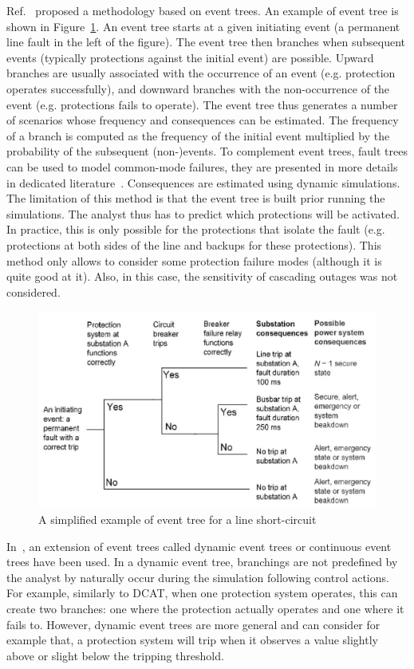 Ref.~\cite{Haarla, GridPSA} proposed a methodology based on event trees. An example of event tree is shown in Figure~\ref{fig:eventTree}. An event tree starts at a given initiating event (a permanent line fault in the left of the figure). The event tree then branches when subsequent events (typically protections against the initial event) are possible. Upward branches are usually associated with the occurrence of an event (e.g. protection operates successfully), and downward branches with the non-occurrence of the event (e.g. protections fails to operate). The event tree thus generates a number of scenarios whose frequency and consequences can be estimated. The frequency of a branch is computed as the frequency of the initial event multiplied by the probability of the subsequent (non-)events. To complement event trees, fault trees can be used to model common-mode failures, they are presented in more details in dedicated literature~\cite{FaultTreeHandbook}. Consequences are estimated using dynamic simulations. The limitation of this method is that the event tree is built prior running the simulations. The analyst thus has to predict which protections will be activated. In practice, this is only possible for the protections that isolate the fault (e.g. protections at both sides of the line and backups for these protections). This method only allows to consider some protection failure modes (although it is quite good at it). Also, in this case, the sensitivity of cascading outages was not considered.

\begin{figure}
    \centering
    \includegraphics[width=0.8\linewidth]{Figs/EventTree.png}
    \caption{A simplified example of event tree for a line short-circuit~\cite{GridPSA}}
    \label{fig:eventTree}
\end{figure}

In~\cite{TwoLevelPSA, Faghihi}, an extension of event trees called dynamic event trees or continuous event trees have been used. In a dynamic event tree, branchings are not predefined by the analyst by naturally occur during the simulation following control actions. For example, similarly to DCAT, when one protection system operates, this can create two branches: one where the protection actually operates and one where it fails to. However, dynamic event trees are more general and can consider for example that, a protection system will trip when it observes a value slightly above or slight below the tripping threshold.

